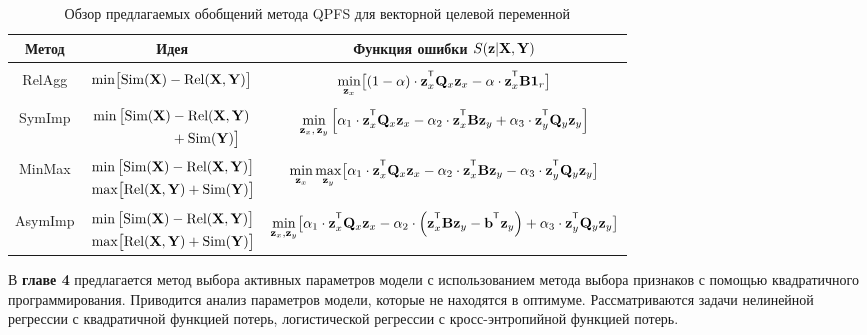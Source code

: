 \documentclass[11pt, a5paper]{dissert}
\begin{document}
\begin{table}[ht]
	\centering
	\caption{Обзор предлагаемых обобщений метода QPFS для векторной целевой переменной}
	\small{
		\begin{tabular}{c|c|c}
			\hline
			Метод & Идея & Функция ошибки $S(\mathbf{z} | \mathbf{X}, \mathbf{Y})$ \\
			\hline && \\ [-.5em]
			RelAgg & $\min \bigl[ \text{Sim}(\mathbf{X}) - \text{Rel}(\mathbf{X}, \mathbf{Y}) \bigr] $ & $\min\limits_{\bz_x} \bigl[ (1 - \alpha) \cdot \bz_x^{\T} \bQ_x \bz_x - \alpha \cdot \bz_x^{\T} \bB \bOne_r \bigr] $ \\ &&\\[-.5em]
			SymImp & $\begin{aligned} \min \, \bigl[ \text{Sim}(\mathbf{X}) & - \text{Rel}(\mathbf{X}, \mathbf{Y}) \\ & + \text{Sim}(\mathbf{Y}) \bigr] \end{aligned}$ & $ \min\limits_{\bz_x, \, \bz_y} \left[ \alpha_1 \cdot \bz_x^{\T} \bQ_x \bz_x - \alpha_2 \cdot \bz_x^{\T} \bB \bz_y + \alpha_3 \cdot \bz_y^{\T} \bQ_y \bz_y \right] $\\ &&\\ [-.5em]
			MinMax & $\begin{aligned} &\min \, \bigl[ \text{Sim}(\mathbf{X}) - \text{Rel}(\mathbf{X}, \mathbf{Y}) \bigr]  \\ & \max \bigl[\text{Rel}(\mathbf{X}, \mathbf{Y}) + \text{Sim}(\mathbf{Y}) \bigr] \end{aligned}$ & $	\min\limits_{\bz_x} 	\max\limits_{\bz_y} \bigl[\alpha_1 \cdot \bz_x^{\T} \bQ_x \bz_x - \alpha_2 \cdot \bz_x^{\T} \bB \bz_y - \alpha_3 \cdot \bz_y^{\T} \bQ_y \bz_y \bigr]$ \\ &&\\ [-.5em]
			AsymImp & $\begin{aligned} & \min \, \bigl[ \text{Sim}(\mathbf{X}) - \text{Rel}(\mathbf{X}, \mathbf{Y}) \bigr]\\ &  \max \bigl[\text{Rel}(\mathbf{X}, \mathbf{Y}) + \text{Sim}(\mathbf{Y}) \bigr] \end{aligned}$ & $\min\limits_{\bz_x, \bz_y} \bigl[ \alpha_1 \cdot \bz_x^{\T} \bQ_x \bz_x - \alpha_2 \cdot \left(\bz_x^{\T} \bB \bz_y - \bb^{\T} \bz_y \right) + \alpha_3 \cdot \bz_y^{\T} \bQ_y \bz_y \bigr]$\\ 
			\hline
	\end{tabular}}
	\label{ch3:tbl:summary}
\end{table}

В \textbf{главе 4} предлагается метод выбора активных параметров модели с использованием метода выбора признаков с помощью квадратичного программирования. 
Приводится анализ параметров модели, которые не находятся в оптимуме.
Рассматриваются задачи нелинейной регрессии с квадратичной функцией потерь, логистической регрессии с кросс-энтропийной функцией потерь.  
\end{document}
